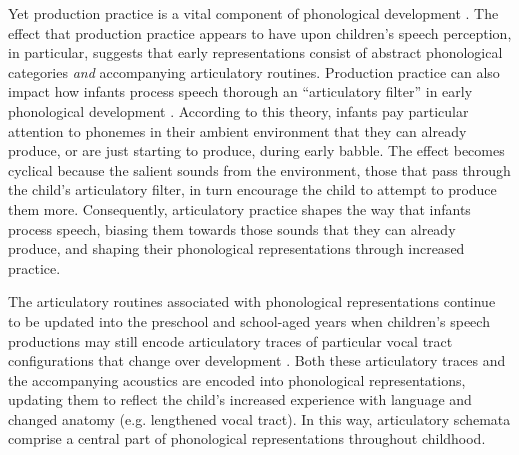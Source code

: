 \documentclass[a4paper,man,natbib,donotrepeattitle, apacite]{apa6}
\begin{document}
Yet production practice is a vital component of phonological development \cite{brudererSensorimotorInfluencesSpeech2015,davisEmergenceDiscretePerceptualMotor2019,keren-portnoyRoleVocalPractice2010,mcallisterbyunMotorInfluencesGrammar2016,mennChallengesTheoriesCharges2013,vihmanLearningWordsLearning2017,zamunerReverseProductionEffect2018}. The effect that production practice appears to have upon children's speech perception, in particular, suggests that early representations consist of abstract phonological categories \textit{and} accompanying articulatory routines. Production practice can also impact how infants process speech thorough an ``articulatory filter'' in early phonological development \cite{depaolisProductionPatternsInfluence2011,depaolisInfluenceBabblingPatterns2013,laingBabbleWordsInfants2020,vihmanVariablePathsEarly1993,vihmanLearningWordsLearning2017}. According to this theory, infants pay particular attention to phonemes in their ambient environment that they can already produce, or are just starting to produce, during early babble. The effect becomes cyclical because the salient sounds from the environment, those that pass through the child's articulatory filter, in turn encourage the child to attempt to produce them more. Consequently, articulatory practice shapes the way that infants process speech, biasing them towards those sounds that they can already produce, and shaping their phonological representations through increased practice. 

The articulatory routines associated with phonological representations continue to be updated into the preschool and school-aged years when children's speech productions may still encode articulatory traces of particular vocal tract configurations that change over development \cite{davisEmergenceDiscretePerceptualMotor2019,mcallisterbyunMotorInfluencesGrammar2016}. Both these articulatory traces and the accompanying acoustics are encoded into phonological representations, updating them to reflect the child's increased experience with language and changed anatomy (e.g. lengthened vocal tract). In this way, articulatory schemata comprise a central part of phonological representations throughout childhood. 
\end{document}
